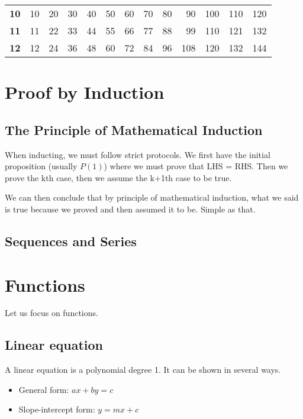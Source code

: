 \documentclass[a4paper]{article}
\theoremstyle{plain}
\theoremstyle{definition}
\theoremstyle{remark}
\newcommand{\sectionSpace}{\vspace{2em}} %
\newcommand{\subsectionSpace}{\vspace{0.5em}}
\begin{document}
\begin{table}[H]
\begin{tabular}{r|rrrrrrrrrrrr}
        \textbf{10} & 10         & 20         & 30         & 40         & 50         & 60         & 70         & 80         & 90         & 100         & 110         & 120         \\
        \textbf{11} & 11         & 22         & 33         & 44         & 55         & 66         & 77         & 88         & 99         & 110         & 121         & 132         \\
        \textbf{12} & 12         & 24         & 36         & 48         & 60         & 72         & 84         & 96         & 108        & 120         & 132         & 144        
        \end{tabular}
    \end{table}


\sectionSpace
\section{Proof by Induction}
    \subsection{The Principle of Mathematical Induction}
    When inducting, we must follow strict protocols. We first have the initial proposition (usually $P(1)$) where we must prove that LHS = RHS. Then we prove the kth case, then we assume the k+1th case to be true. 

    We can then conclude that by principle of mathematical induction, what we said is true because we proved and then assumed it to be. Simple as that.

    \subsectionSpace
    \subsection{Sequences and Series}



\sectionSpace
\section{Functions}
Let us focus on functions. 
    \subsection{Linear equation}
    A linear equation is a polynomial degree 1. It can be shown in several ways.
    \begin{itemize}
        \item General form: $ax + by = c$
        \item Slope-intercept form: $y = mx + c$
    \end{itemize}
\end{document}
